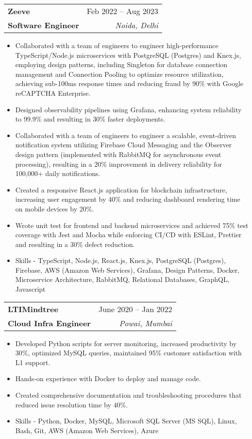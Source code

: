 \documentclass[letterpaper,11pt]{article}
\makeatletter
\newcommand{\resumeItem}[1]{
  \item\small{
    {#1 \vspace{-2pt}}
  }
}
\newcommand{\resumeSubheading}[4]{
  \vspace{-2pt}\item
    \begin{tabular*}{0.97\textwidth}[t]{l@{\extracolsep{\fill}}r}
      \textbf{#1} & #2 \\
      \textbf{#3} & \textit{\small #4} \\
    \end{tabular*}\vspace{-7pt}
}
\newcommand{\resumeItemListStart}{\begin{itemize}}
\newcommand{\resumeItemListEnd}{\end{itemize}\vspace{-5pt}}
\makeatother
\begin{document}
    \resumeSubheading
      {Zeeve    }{Feb 2022 -- Aug 2023}
      {\textbf {Software Engineer}}{Noida, Delhi}
      \resumeItemListStart
       \resumeItem{Collaborated with a team of engineers to engineer high-performance TypeScript/Node.js microservices with PostgreSQL (Postgres) and Knex.js, employing design patterns, including Singleton for database connection management and Connection Pooling to optimize resource utilization, achieving sub-100ms response times and reducing fraud by 90\% with Google reCAPTCHA Enterprise.}\\
        \resumeItem{Designed observability pipelines using Grafana, enhancing system reliability to 99.9\% and resulting in 30\% faster deployments.} \\
        \resumeItem{Collaborated with a team of engineers to engineer a scalable, event-driven notification system utilizing Firebase Cloud Messaging and the Observer design pattern (implemented with RabbitMQ for asynchronous event processing), resulting in a 20\% improvement in delivery reliability for 100,000+ daily notifications.} \\
        \resumeItem{Created a responsive React.js application for blockchain infrastructure, increasing user engagement by 40\% and reducing dashboard rendering time on mobile devices by 20\%.} \\
        \resumeItem{Wrote unit test for frontend and backend microservices and achieved 75\% test coverage with Jest and Mocha while enforcing CI/CD with ESLint, Prettier and resulting in a 30\% defect reduction.} \\
        \resumeItem{Skills - TypeScript, Node.js, React.js, Knex.js, PostgreSQL (Postgres), Firebase, AWS (Amazon Web Services), Grafana, Design Patterns, Docker, Microservice Architecture, RabbitMQ, Relational Databases, GraphQL, Javascript}
      \resumeItemListEnd
      

    
\vspace{2em} %

    \resumeSubheading
      {LTIMindtree}{June 2020 -- Jan 2022}
      {\textbf {Cloud Infra Engineer}}{Powai, Mumbai}
      \resumeItemListStart
       \resumeItem{Developed Python scripts for server monitoring, increased productivity by 30\%, optimized MySQL queries, maintained 95\% customer satisfaction with L1 support.} \\
        \resumeItem{Hands-on experience with Docker to deploy and manage code.} \\
        \resumeItem{Created comprehensive documentation and troubleshooting procedures that reduced issue resolution time by 40\%.} \\
        \resumeItem{Skills - Python, Docker, MySQL, Microsoft SQL Server (MS SQL), Linux, Bash, Git, AWS (Amazon Web Services), Azure}
      \resumeItemListEnd
\end{document}
